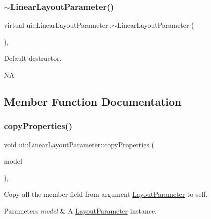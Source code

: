 \subsubsection{\texorpdfstring{$\sim$\+Linear\+Layout\+Parameter()}{~LinearLayoutParameter()}\hspace{0.1cm}{\footnotesize\ttfamily [2/2]}}
{\footnotesize\ttfamily virtual ui\+::\+Linear\+Layout\+Parameter\+::$\sim$\+Linear\+Layout\+Parameter (\begin{DoxyParamCaption}{ }\end{DoxyParamCaption})\hspace{0.3cm}{\ttfamily [inline]}, {\ttfamily [virtual]}}

Default destructor.

NA 

\subsection{Member Function Documentation}
\mbox{\label{classui_1_1LinearLayoutParameter_a8d9e9d1475927a7dcfda3cfe0581f164}} 
\subsubsection{\texorpdfstring{copy\+Properties()}{copyProperties()}\hspace{0.1cm}{\footnotesize\ttfamily [1/2]}}
{\footnotesize\ttfamily void ui\+::\+Linear\+Layout\+Parameter\+::copy\+Properties (\begin{DoxyParamCaption}\item[{\hyperlink{classui_1_1LayoutParameter}{Layout\+Parameter} $\ast$}]{model }\end{DoxyParamCaption})\hspace{0.3cm}{\ttfamily [override]}, {\ttfamily [virtual]}}

Copy all the member field from argument \hyperlink{classui_1_1LayoutParameter}{Layout\+Parameter} to self. 
\begin{DoxyParams}{Parameters}
{\em model} & A \hyperlink{classui_1_1LayoutParameter}{Layout\+Parameter} instance. \\
\hline
\end{DoxyParams}


